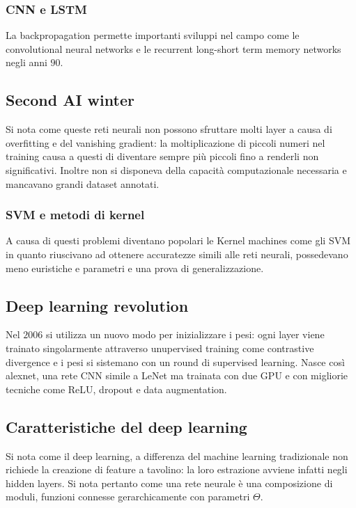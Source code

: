 		\subsubsection{CNN e LSTM}
		La backpropagation permette importanti sviluppi nel campo come le convolutional neural networks e le recurrent long-short term memory networks negli anni $90$.

	\subsection{Second AI winter}
	Si nota come queste reti neurali non possono sfruttare molti layer a causa di overfitting e del vanishing gradient: la moltiplicazione di piccoli numeri nel training causa a questi di diventare sempre pi\`u piccoli fino a renderli non significativi.
	Inoltre non si disponeva della capacit\`a computazionale necessaria e mancavano grandi dataset annotati.

		\subsubsection{SVM e metodi di kernel}
		A causa di questi problemi diventano popolari le Kernel machines come gli SVM in quanto riuscivano ad ottenere accuratezze simili alle reti neurali, possedevano meno euristiche e parametri e una prova di generalizzazione.

	\subsection{Deep learning revolution}
	Nel $2006$ si utilizza un nuovo modo per inizializzare i pesi: ogni layer viene trainato singolarmente attraverso unupervised training come contrastive divergence e i pesi si sistemano con un round di supervised learning.
	Nasce cos\`i alexnet, una rete CNN simile a LeNet ma trainata con due GPU e con migliorie tecniche come ReLU, dropout e data augmentation.

	\subsection{Caratteristiche del deep learning}
	Si nota come il deep learning, a differenza del machine learning tradizionale non richiede la creazione di feature a tavolino: la loro estrazione avviene infatti negli hidden layers.
	Si nota pertanto come una rete neurale \`e una composizione di moduli, funzioni connesse gerarchicamente con parametri $\Theta$.

